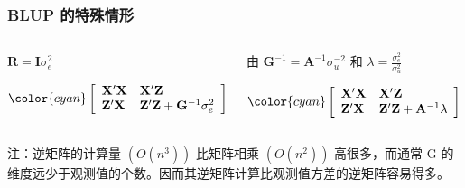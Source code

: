 \documentclass[serif,aspectratio=169]{beamer}
\begin{document}
\begin{frame}
  \frametitle{BLUP 的特殊情形}
  \begin{columns}
    \begin{column}{.5\textwidth}
      \begin{block}{$\mathbf{R=I}\sigma_e^2$}

        $$
        \color{cyan}\left[\begin{array}{ll}
            \mathbf{X}'\mathbf{X} & \mathbf{X}'\mathbf{Z}\\
            \mathbf{Z}'\mathbf{X} & \mathbf{Z}'\mathbf{Z}+\mathbf{G}^{-1}\sigma_e^2
          \end{array}\right]
        \left[\begin{array}{cc}
            \hat{\mathbf{b}}\\
            \hat{\mathbf{u}}
          \end{array}\right] = 
        \left[\begin{array}{c}
            \mathbf{X}'\mathbf{y}\\
            \mathbf{Z}'\mathbf{y}
          \end{array}\right]
        $$
        
      \end{block}
    \end{column}

    \begin{column}{.5\textwidth}
      \begin{block}{由 $\mathbf{G}^{-1}=\mathbf{A}^{-1}\sigma_u^{-2}$ 和 $\lambda=\frac{\sigma_e^2}{\sigma_u^2}$}

        $$
        \color{cyan}\left[\begin{array}{ll}
            \mathbf{X}'\mathbf{X} & \mathbf{X}'\mathbf{Z}\\
            \mathbf{Z}'\mathbf{X} & \mathbf{Z}'\mathbf{Z}+\mathbf{A}^{-1}\lambda
          \end{array}\right]
        \left[\begin{array}{cc}
            \hat{\mathbf{b}}\\
            \hat{\mathbf{u}}
          \end{array}\right] = 
        \left[\begin{array}{c}
            \mathbf{X}'\mathbf{y}\\
            \mathbf{Z}'\mathbf{y}
          \end{array}\right]
        $$
        
      \end{block}
    \end{column}
  \end{columns}
  \tiny{注：逆矩阵的计算量 $(O(n^3))$ 比矩阵相乘 $(O(n^2))$ 高很多，而通常 G 的维度远少于观测值的个数。因而其逆矩阵计算比观测值方差的逆矩阵容易得多。}
\end{frame}
\end{document}
